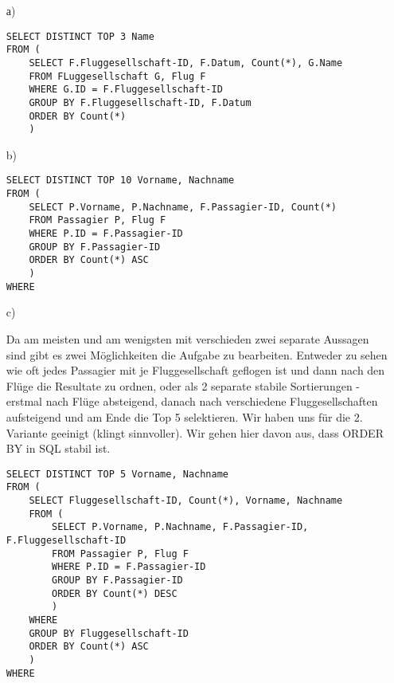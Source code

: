 \begin{itemize}

\item[а)]
\begin{Verbatim}
SELECT DISTINCT TOP 3 Name
FROM (
	SELECT F.Fluggesellschaft-ID, F.Datum, Count(*), G.Name
	FROM FLuggesellschaft G, Flug F
	WHERE G.ID = F.Fluggesellschaft-ID
	GROUP BY F.Fluggesellschaft-ID, F.Datum
	ORDER BY Count(*)
	)
\end{Verbatim}

\item[b)]
\begin{Verbatim}
SELECT DISTINCT TOP 10 Vorname, Nachname
FROM (
	SELECT P.Vorname, P.Nachname, F.Passagier-ID, Count(*)
	FROM Passagier P, Flug F
	WHERE P.ID = F.Passagier-ID
	GROUP BY F.Passagier-ID
	ORDER BY Count(*) ASC
	)
WHERE
\end{Verbatim}

\item[c)]

Da am meisten und am wenigsten mit verschieden zwei separate Aussagen sind gibt es zwei Möglichkeiten die Aufgabe zu bearbeiten. Entweder zu sehen wie oft jedes Passagier mit je Fluggesellschaft geflogen ist und dann nach den Flüge die Resultate zu ordnen, oder als 2 separate stabile Sortierungen - erstmal nach Flüge absteigend, danach nach verschiedene Fluggesellschaften aufsteigend und am Ende die Top 5 selektieren. Wir haben uns für die 2. Variante geeinigt (klingt sinnvoller). Wir gehen hier davon aus, dass ORDER BY in SQL stabil ist.

\begin{Verbatim}
SELECT DISTINCT TOP 5 Vorname, Nachname
FROM (
	SELECT Fluggesellschaft-ID, Count(*), Vorname, Nachname
	FROM (
		SELECT P.Vorname, P.Nachname, F.Passagier-ID, F.Fluggesellschaft-ID
		FROM Passagier P, Flug F
		WHERE P.ID = F.Passagier-ID
		GROUP BY F.Passagier-ID
		ORDER BY Count(*) DESC
		)
	WHERE
	GROUP BY Fluggesellschaft-ID
	ORDER BY Count(*) ASC
	)
WHERE
\end{Verbatim}


\end{itemize}


